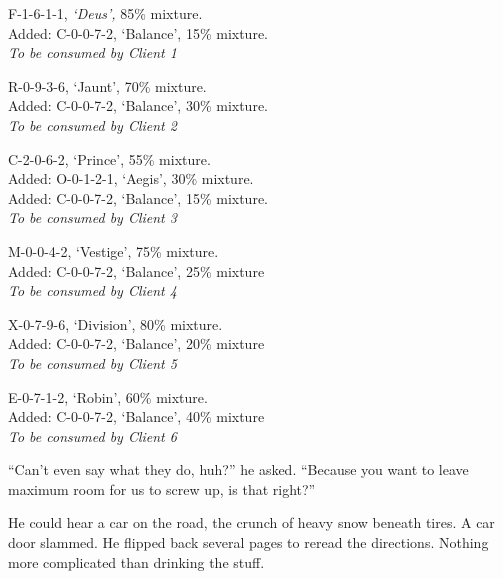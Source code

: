 \begin{description}
    \item{} F-1-6-1-1, \emph{`Deus', }85\% mixture.
    \\  Added: C-0-0-7-2, `Balance', 15\% mixture.
    \\  {\hfill \emph{To be consumed by Client 1}}

    \item[\strong{Canister B:}]  R-0-9-3-6, `Jaunt', 70\% mixture.
    \\ Added: C-0-0-7-2, `Balance', 30\% mixture.
    \\  {\hfill \emph{To be consumed by Client 2}}

    \item[\strong{Canister C:}] C-2-0-6-2, `Prince', 55\% mixture.
    \\  Added: O-0-1-2-1, `Aegis', 30\% mixture.
    \\  Added: C-0-0-7-2, `Balance', 15\% mixture.
    \\  {\hfill \emph{To be consumed by Client 3}}
    
    \item[\strong{Canister D:}] M-0-0-4-2, `Vestige', 75\% mixture.
    \\  Added: C-0-0-7-2, `Balance', 25\% mixture
    \\  {\hfill \emph{To be consumed by Client 4}}

    \item[\strong{Canister E:}] X-0-7-9-6, `Division', 80\% mixture.
    \\  Added: C-0-0-7-2, `Balance', 20\% mixture
    \\  {\hfill \emph{To be consumed by Client 5}}
    
    \item[\strong{Canister F:}] E-0-7-1-2, `Robin', 60\% mixture.
    \\  Added: C-0-0-7-2, `Balance', 40\% mixture
    \\  {\hfill \emph{To be consumed by Client 6}}
\end{description}


``Can't even say what they do, huh?'' he asked.  ``Because you want to leave maximum room for us to screw up, is that right?''



He could hear a car on the road, the crunch of heavy snow beneath tires.  A car door slammed.  He flipped back several pages to reread the directions.  Nothing more complicated than drinking the stuff.




